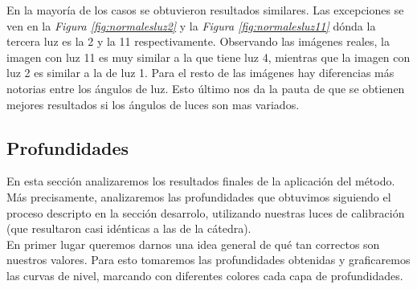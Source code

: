 En la mayoría de los casos se obtuvieron resultados similares. Las excepciones se ven en la \textit{Figura \ref{fig:normalesluz2}} y la \textit{Figura \ref{fig:normalesluz11}} dónda la tercera luz es la 2 y la 11 respectivamente. Observando las imágenes reales, la imagen con luz 11 es muy similar a la que tiene luz 4, mientras que la imagen con luz 2 es similar a la de luz 1. Para el resto de las imágenes hay diferencias más notorias entre los ángulos de luz. Esto último nos da la pauta de que se obtienen mejores resultados si los ángulos de luces son mas variados.

















\newpage
\subsection{Profundidades}

En esta sección analizaremos los resultados finales de la aplicación del método. Más precisamente, analizaremos las profundidades que obtuvimos siguiendo el proceso descripto en la sección desarrolo, utilizando nuestras luces de calibración (que resultaron casi idénticas a las de la cátedra). \\

En primer lugar queremos darnos una idea general de qué tan correctos son nuestros valores. Para esto tomaremos las profundidades obtenidas y graficaremos las curvas de nivel, marcando con diferentes colores cada capa de profundidades. \\




